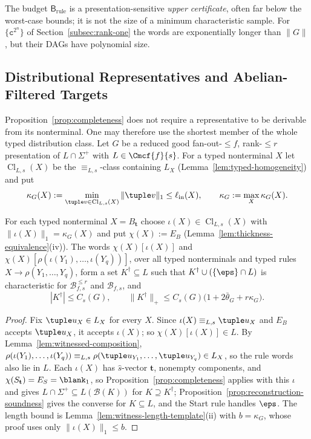 The budget $\mathsf B_{\mathrm{rule}}$ is a presentation-sensitive \emph{upper
certificate}, often far below the worst-case bounds; it is not the size of a
minimum characteristic sample.  For $\{\mathtt c^{2^n}\}$ of
Section~\ref{subsec:rank-one} the words are exponentially longer than $\|G\|$, but
their DAGs have polynomial size.

\subsection{Distributional Representatives and Abelian-Filtered Targets}
\label{subsec:short-distributional-representatives}

Proposition~\ref{prop:completeness} does not require a representative to be
derivable from its nonterminal.  One may therefore use the shortest member of the
whole typed distribution class.  Let $G$ be a reduced good fan-out-$\le f$,
rank-$\le r$ presentation of $L\cap\Sigma^+$ with $L\in\Cmcf{f}{s}$.  For a typed
nonterminal $X$ let $\operatorname{Cl}_{L,s}(X)$ be the $\equiv_{L,s}$-class containing $L_X$
(Lemma~\ref{lem:typed-homogeneity}) and put
\[
 \kappa_G(X):=\min_{\tuple v\in\operatorname{Cl}_{L,s}(X)}\|\tuple v\|_1\le\ell_{\mathrm{in}}(X),\qquad
 \kappa_G:=\max_X\kappa_G(X).
\]

\begin{proposition}
\label{prop:mcfg-relaxed-witnesses}
For each typed nonterminal $X=B_{\mathbf t}$ choose $\iota(X)\in\operatorname{Cl}_{L,s}(X)$ with
$\|\iota(X)\|_1=\kappa_G(X)$ and put $\chi(X):=E_B$
(Lemma~\ref{lem:thickness-equivalence}(iv)).  The words $\chi(X)[\iota(X)]$ and
$\chi(X)[\rho(\iota(Y_1),\ldots,\iota(Y_q))]$, over all typed nonterminals and
typed rules $X\to\rho(Y_1,\ldots,Y_q)$, form a set $K^\dagger\subseteq L$ such that
$K^\dagger\cup(\{\eps\}\cap L)$ is characteristic for $\mathcal B^{\le r}_{f,s}$ and
$\mathcal B_{f,s}$, and
\[
 |K^\dagger|\le C_s(G),\qquad
 \|K^\dagger\|_+\le C_s(G)\bigl(1+2\bar\theta_G+r\kappa_G\bigr).
\]
\end{proposition}

\begin{proof}
Fix $\tuple u_X\in L_X$ for every $X$.  Since $\iota(X)\equiv_{L,s}\tuple u_X$ and
$E_B$ accepts $\tuple u_X$, it accepts $\iota(X)$; so
$\chi(X)[\iota(X)]\in L$.  By Lemma~\ref{lem:witnessed-composition},
$\rho(\iota(Y_1),\ldots,\iota(Y_q))\equiv_{L,s}\rho(\tuple u_{Y_1},\ldots,
\tuple u_{Y_q})\in L_X$, so the rule words also lie in $L$.  Each $\iota(X)$ has
$\widehat s$-vector $\mathbf t$, nonempty components, and $\chi(S_{\mathbf t})=
E_S=\blank_1$, so Proposition~\ref{prop:completeness} applies with this $\iota$
and gives $L\cap\Sigma^+\subseteq L(\mathcal B(K))$ for $K\supseteq K^\dagger$;
Proposition~\ref{prop:reconstruction-soundness} gives the converse for
$K\subseteq L$, and the Start rule handles $\eps$.  The length bound is
Lemma~\ref{lem:witness-length-template}(ii) with $b=\kappa_G$, whose proof uses only
$\|\iota(X)\|_1\le b$.
\end{proof}

